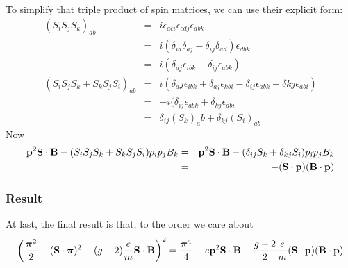 To simplify that triple product of spin matrices, we can use their explicit form:
\begin{eqnarray*}
	(S_i S_j S_k )_{ab}
		&=&	i\epsilon_{aci}\epsilon_{cdj}\epsilon_{dbk}	\\
		&=&	i(\delta_{id} \delta_{aj} - \delta_{ij} \delta_{ad})\epsilon_{dbk}	\\
		&=&	i(\delta_{aj} \epsilon_{ibk} - \delta_{ij} \epsilon_{abk})		\\
	(S_i S_j S_k + S_k S_j S_i)_{ab}
		&=& i(\delta_aj \epsilon_{ibk} + \delta_{aj} \epsilon_{kbi} -\delta_{ij} \epsilon_{abk} -\delta{kj}\epsilon_{abi})	\\
		&=& -i(\delta_{ij} \epsilon_{abk} + \delta_{kj} \epsilon_{abi}	\\
		&=&	\delta_{ij} {(S_k)}_ab + \delta_{kj} {(S_i)}_{ab}	
\end{eqnarray*}
Now 
\begin{eqnarray*}
 \mathbf{p}^2 \mathbf{S} \cdot \mathbf{B} - (S_i S_j S_k + S_k S_j S_i) p_i p_j B_k
 	&=& \mathbf{p}^2 \mathbf{S} \cdot \mathbf{B} - (\delta_{ij} S_k + \delta_{kj} S_i	) p_i p_j B_k	\\
 	&=& - (\mathbf{S} \cdot \mathbf{p}) (\mathbf{B} \cdot \mathbf{p})
\end{eqnarray*}
\subsubsection*{Result}
At last, the final result is that, to the order we care about 
\[
\left(  \frac {\mbox{\boldmath$ \pi $}^2} {2} -  (\mathbf{S} \cdot \mbox{\boldmath$ \pi $})^2 + (g-2)\frac{e}{m} \mathbf{S} \cdot \mathbf{B} \right )^2 
	=	\frac{ \mbox{\boldmath$ \pi $}^4 } {4}  -  e \mathbf{p}^2  \mathbf{S} \cdot \mathbf{B} \\
		 -\frac{g-2}{2}\frac{e}{m} (\mathbf{S} \cdot \mathbf{p}) (\mathbf{B} \cdot \mathbf{p})
\]	



